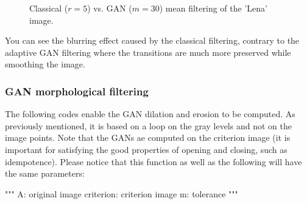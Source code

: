 \begin{figure}[htbp]
\centering\caption{Classical ($r=5$) vs. GAN ($m=30$) mean filtering of the 'Lena' image.}
 \hfill
 \hfill
 \end{figure}

\noindent You can see the blurring effect caused by the classical filtering, contrary to the adaptive GAN filtering where the transitions are much more preserved while smoothing the image. 

\subsubsection{GAN morphological filtering}
The following codes enable the GAN dilation and erosion to be computed. As previously mentioned, it is based on a loop on the gray levels and not on the image points. Note that the GANs ae computed on the criterion image (it is important for satisfying the good properties of opening and closing, such as idempotence).
Please notice that this function as well as the following will have the same parameters:
\begin{python}
"""
A: original image
criterion: criterion image
m: tolerance
"""
\end{python}

